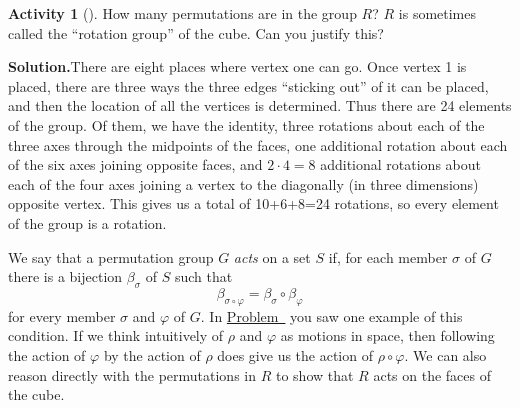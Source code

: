\documentclass[10pt,]{book}
\theoremstyle{plain}
\theoremstyle{definition}
\newtheorem{activity}[project]{Activity}
\numberwithin{equation}{chapter}
\begin{document}
\begin{activity}[]\label{activity-264}
How many permutations are in the group \(R\)? \(R\) is sometimes called the ``rotation group'' of the cube. Can you justify this?%
\par\medskip\noindent%
\textbf{Solution.}\quad There are eight places where vertex one can go. Once vertex 1 is placed, there are three ways the three edges ``sticking out'' of it can be placed, and then the location of all the vertices is determined. Thus there are 24 elements of the group. Of them, we have the identity, three rotations about each of the three axes through the midpoints of the faces, one additional rotation about each of the six axes joining opposite faces, and \(2\cdot4=8\) additional rotations about each of the four axes joining a vertex to the diagonally (in three dimensions) opposite vertex. This gives us a total of 10+6+8=24 rotations, so every element of the group is a rotation.%
\end{activity}
We say that a permutation group \(G\) \emph{acts} on a set \(S\) if, for each member \(\sigma\) of \(G\) there is a bijection \(\beta_{\sigma}\) of \(S\) such that%
\begin{equation*}
\beta_{\sigma\circ\varphi} = \beta_{\sigma}\circ\beta_{\varphi}
\end{equation*}
for every member \(\sigma\) and \(\varphi\) of \(G\). In \hyperref[cube2]{Problem~} you saw one example of this condition. If we think intuitively of \(\rho\) and \(\varphi\) as motions in space, then following the action of \(\varphi\) by the action of \(\rho\) does give us the action of \(\rho\circ\varphi\). We can also reason directly with the permutations in \(R\) to show that \(R\) acts on the faces of the cube.%
\end{document}
